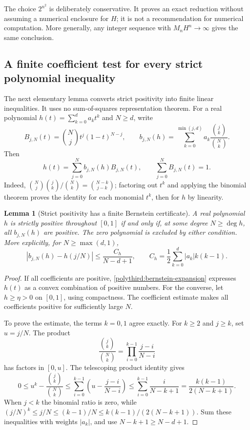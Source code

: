 \documentclass[11pt]{article}
\newtheorem{lemma}[theorem]{Lemma}
\theoremstyle{remark}
\numberwithin{equation}{section}
\begin{document}
The choice $2^{n^2}$ is deliberately conservative.  It proves an exact
reduction without assuming a numerical enclosure for $H$; it is not
a recommendation for numerical computation.  More generally, any
integer sequence with $M_nH^n\to\infty$ gives the same conclusion.

\subsection{A finite coefficient test for every strict polynomial inequality}
\label{polythird:bernstein-positive}
The next elementary lemma converts strict positivity into finite linear
inequalities.  It uses no sum-of-squares representation theorem.
For a real polynomial $h(t)=\sum_{k=0}^d a_kt^k$ and $N\ge d$, write
\[
 B_{j,N}(t)=\binom Nj t^j(1-t)^{N-j},\qquad
 b_{j,N}(h)=\sum_{k=0}^{\min(j,d)}a_k\frac{\binom jk}{\binom Nk}.
\]
Then
\begin{equation}\label{polythird:bernstein-expansion}
 h(t)=\sum_{j=0}^N b_{j,N}(h)B_{j,N}(t),\qquad
 \sum_{j=0}^N B_{j,N}(t)=1.
\end{equation}
Indeed,
$\binom Nj\binom jk/\binom Nk=\binom{N-k}{j-k}$;
factoring out $t^k$ and applying the binomial theorem proves the
identity for each monomial $t^k$, then for $h$ by linearity.

\begin{lemma}[Strict positivity has a finite Bernstein certificate]
\label{polythird:bernstein-certificate}
A real polynomial $h$ is strictly positive throughout $[0,1]$ if and
only if, at some degree $N\ge\deg h$, all $b_{j,N}(h)$ are positive.
The zero polynomial is excluded by either condition.  More explicitly,
for $N\ge\max(d,1)$,
\begin{equation}\label{polythird:bernstein-estimate}
 \left|b_{j,N}(h)-h(j/N)\right|
 \le\frac{C_h}{N-d+1},\qquad
 C_h=\frac12\sum_{k=0}^d|a_k|k(k-1).
\end{equation}
\end{lemma}
\begin{proof}
If all coefficients are positive, \eqref{polythird:bernstein-expansion}
expresses $h(t)$ as a convex combination of positive numbers.
For the converse, let $h\ge\eta>0$ on $[0,1]$, using compactness.
The coefficient estimate makes all coefficients positive for sufficiently
large $N$.

To prove the estimate, the terms $k=0,1$ agree exactly.  For $k\ge2$
and $j\ge k$, set $u=j/N$.  The product
\[
 \frac{\binom jk}{\binom Nk}
 =\prod_{i=0}^{k-1}\frac{j-i}{N-i}
\]
has factors in $[0,u]$.  The telescoping product identity gives
\[
 0\le u^k-\frac{\binom jk}{\binom Nk}
 \le\sum_{i=0}^{k-1}\left(u-\frac{j-i}{N-i}\right)
 \le\sum_{i=0}^{k-1}\frac{i}{N-k+1}
 =\frac{k(k-1)}{2(N-k+1)}.
\]
When $j<k$ the binomial ratio is zero, while
$(j/N)^k\le j/N\le(k-1)/N\le k(k-1)/(2(N-k+1))$.
Sum these inequalities with weights $|a_k|$, and use
$N-k+1\ge N-d+1$.
\end{proof}
\end{document}
